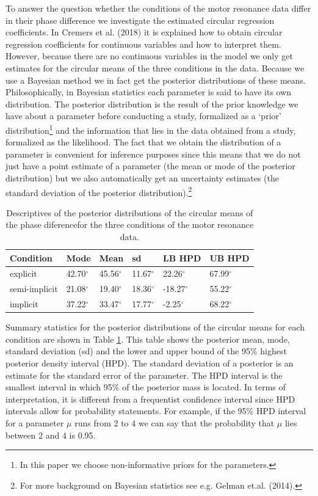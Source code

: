 \documentclass[11pt,]{article}
\let\rmarkdownfootnote\footnote%
\def\footnote{\protect\rmarkdownfootnote}
\begin{document}
To answer the question whether the conditions of the motor resonance
data differ in their phase difference we investigate the estimated
circular regression coefficients. In Cremers et al. (2018) it is
explained how to obtain circular regression coefficients for continuous
variables and how to interpret them. However, because there are no
continuous variables in the model we only get estimates for the circular
means of the three conditions in the data. Because we use a Bayesian
method we in fact get the posterior distributions of these means.
Philosophically, in Bayesian statistics each parameter is said to have
its own distribution. The posterior distribution is the result of the
prior knowledge we have about a parameter before conducting a study,
formalized as a `prior'
distribution\footnote{In this paper we choose non-informative priors for
the parameters.} and the information that lies in the data obtained from
a study, formalized as the likelihood. The fact that we obtain the
distribution of a parameter is convenient for inference purposes since
this means that we do not just have a point estimate of a parameter (the
mean or mode of the posterior distribution) but we also automatically
get an uncertainty estimates (the standard deviation of the posterior
distribution).\footnote{For more background
on Bayesian statistics see e.g. Gelman et.al. (2014).}

\begin{table}
\centering
\caption{Descriptives of the posterior distributions of the circular means of the phase diferencefor the three conditions of the motor resonance data.} 
\begin{tabular}{llllll}
  \hline\noalign{\smallskip}
Condition & Mode & Mean & sd & LB HPD & UB HPD\\ \hline\noalign{\smallskip}
explicit & 42.70$^\circ$ & 45.56$^\circ$ & 11.67$^\circ$ & 22.26$^\circ$ & 67.99$^\circ$\\
semi-implicit & 21.08$^\circ$ & 19.40$^\circ$ & 18.36$^\circ$ & -18.27$^\circ$ & 55.22$^\circ$\\
implicit & 37.22$^\circ$ & 33.47$^\circ$ & 17.77$^\circ$ & -2.25$^\circ$ & 68.22$^\circ$\\
   \hline
\end{tabular}
\label{TableresMRmean}
\end{table}

Summary statistics for the posterior distributions of the circular means
for each condition are shown in Table \ref{TableresMRmean}. This table
shows the posterior mean, mode, standard deviation (sd) and the lower
and upper bound of the 95\(\%\) highest posterior density interval
(HPD). The standard deviation of a posterior is an estimate for the
standard error of the parameter. The HPD interval is the smallest
interval in which 95\(\%\) of the posterior mass is located. In terms of
interpretation, it is different from a frequentist confidence interval
since HPD intervals allow for probability statements. For example, if
the 95\(\%\) HPD interval for a parameter \(\mu\) runs from 2 to 4 we
can say that the probability that \(\mu\) lies between 2 and 4 is 0.95.
\end{document}
